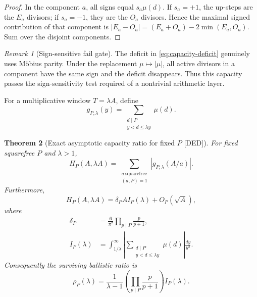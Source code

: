 \documentclass[11pt]{amsart}
\numberwithin{equation}{section}
\theoremstyle{plain}
\newtheorem{theorem}{Theorem}[section]
\theoremstyle{definition}
\theoremstyle{remark}
\newtheorem{remark}[theorem]{Remark}
\newcommand{\Mob}{\mu}
\newcommand{\DED}{\textup{[DED]}}
\begin{document}
\begin{proof}
In the component $a$, all signs equal $s_a\Mob(d)$.  If $s_a=+1$, the up-steps are the $E_a$ divisors; if
$s_a=-1$, they are the $O_a$ divisors.  Hence the maximal signed contribution of that component is
$|E_a-O_a|=(E_a+O_a)-2\min(E_a,O_a)$.  Sum over the disjoint components.
\end{proof}

\begin{remark}[Sign-sensitive fail gate]
\label{rem:capacity-sign-sensitive}
The deficit in \eqref{eq:capacity-deficit} genuinely uses M\"obius parity.  Under the replacement
$\Mob\mapsto|\Mob|$, all active divisors in a component have the same sign and the deficit disappears.  Thus this
capacity passes the sign-sensitivity test required of a nontrivial arithmetic layer.
\end{remark}

For a multiplicative window $T=\lambda A$, define
\begin{equation}
g_{P,\lambda}(y)
=
\sum_{\substack{d\mid P\\y<d\le\lambda y}}\Mob(d).
\label{eq:divisor-window-kernel}
\end{equation}

\begin{theorem}[Exact asymptotic capacity ratio for fixed $P$ \DED]
\label{thm:rho-capacity}
For fixed squarefree $P$ and $\lambda>1$,
\begin{equation}
H_P(A,\lambda A)
=
\sum_{\substack{a\ \mathrm{squarefree}\\(a,P)=1}}
\left|g_{P,\lambda}(A/a)\right|.
\label{eq:capacity-sum-kernel}
\end{equation}
Furthermore,
\begin{equation}
H_P(A,\lambda A)
=
\delta_PA I_P(\lambda)+O_P(\sqrt A),
\label{eq:capacity-asymptotic}
\end{equation}
where
\begin{align}
\delta_P&=\frac6{\pi^2}\prod_{p\mid P}\frac{p}{p+1},
\label{eq:coprime-squarefree-density}\\
I_P(\lambda)&=
\int_{1/\lambda}^{\infty}
\left|
\sum_{\substack{d\mid P\\y<d\le\lambda y}}\Mob(d)
\right|\frac{dy}{y^2}.
\label{eq:capacity-integral}
\end{align}
Consequently the surviving ballistic ratio is
\begin{equation}
\boxed{
\rho_P(\lambda)
=
\frac{1}{\lambda-1}
\left(\prod_{p\mid P}\frac{p}{p+1}\right)
I_P(\lambda).}
\label{eq:rho-definition}
\end{equation}
\end{theorem}
\end{document}
